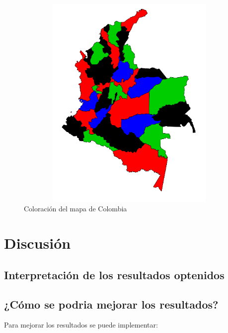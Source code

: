 \documentclass[a4paper]{article}
\begin{document}
\begin{figure}
	\centering
	\includegraphics[width=12.5cm,height=10.5cm]{Colombia.png}
	\caption{Coloración del mapa de Colombia}
	\label{FI2_1}
\end{figure}

\pagebreak
\section{Discusi\'on}
\subsection{Interpretaci\'on de los resultados optenidos}

\subsection{¿C\'omo se podria mejorar los resultados?}

Para mejorar los resultados se puede implementar:
\end{document}
